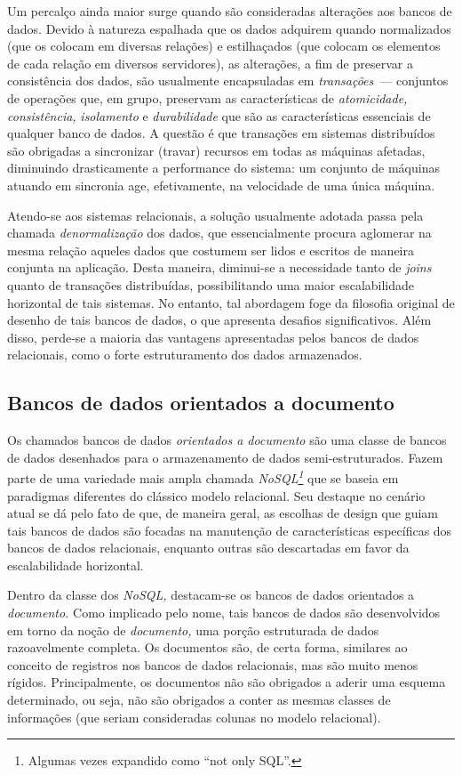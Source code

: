 \documentclass[ruledheader, 12pt]{abnt}
\begin{document}
Um percalço ainda maior surge quando são consideradas alterações aos bancos de dados. Devido à natureza espalhada que os dados adquirem quando normalizados (que os colocam em diversas relações) e estilhaçados (que colocam os elementos de cada relação em diversos servidores), as alterações, a fim de preservar a consistência dos dados, são usualmente encapsuladas em \emph{transações}~--- conjuntos de operações que, em grupo, preservam as características de \emph{atomicidade,} \emph{consistência,} \emph{isolamento} e \emph{durabilidade} que são as características essenciais de qualquer banco de dados. A questão é que transações em sistemas distribuídos são obrigadas a sincronizar (travar) recursos em todas as máquinas afetadas, diminuindo drasticamente a performance do sistema: um conjunto de máquinas atuando em sincronia age, efetivamente, na velocidade de uma única máquina.

Atendo-se aos sistemas relacionais, a solução usualmente adotada passa pela chamada \emph{denormalização} dos dados, que essencialmente procura aglomerar na mesma relação aqueles dados que costumem ser lidos e escritos de maneira conjunta na aplicação. Desta maneira, diminui-se a necessidade tanto de \emph{joins} quanto de transações distribuídas, possibilitando uma maior escalabilidade horizontal de tais sistemas. No entanto, tal abordagem foge da filosofia original de desenho de tais bancos de dados, o que apresenta desafios significativos. Além disso, perde-se a maioria das vantagens apresentadas pelos bancos de dados relacionais, como o forte estruturamento dos dados armazenados.

\subsection{Bancos de dados orientados a documento}

Os chamados bancos de dados \emph{orientados a documento} são uma classe de bancos de dados desenhados para o armazenamento de dados semi-estruturados. Fazem parte de uma variedade mais ampla chamada  \emph{NoSQL\footnote{Algumas vezes expandido como ``not only SQL''.}} que se baseia em paradigmas diferentes do clássico modelo relacional. Seu destaque no cenário atual se dá pelo fato de que, de maneira geral, as escolhas de design que guiam tais bancos de dados são focadas na manutenção de características específicas dos bancos de dados relacionais, enquanto outras são descartadas em favor da escalabilidade horizontal.

Dentro da classe dos \emph{NoSQL,} destacam-se os bancos de dados orientados a \emph{documento.} Como implicado pelo nome, tais bancos de dados são desenvolvidos em torno da noção de \emph{documento,} uma porção estruturada de dados razoavelmente completa. Os documentos são, de certa forma, similares ao conceito de registros nos bancos de dados relacionais, mas são muito menos rígidos. Principalmente, os documentos não são obrigados a aderir uma esquema determinado, ou seja, não são obrigados a conter as mesmas classes de informações (que seriam consideradas colunas no modelo relacional).
\end{document}
